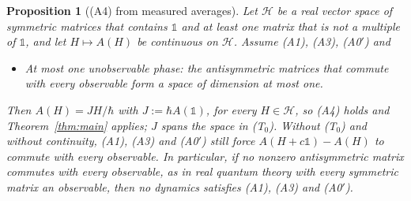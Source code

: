 \documentclass[11pt]{article}
\newtheorem{proposition}[theorem]{Proposition}
\theoremstyle{remark}
\newcommand{\one}{\mathbb{1}}
\begin{document}
\begin{proposition}[(A4) from measured averages]\label{prop:avg}
Let $\mathcal{H}$ be a real vector space of symmetric matrices that contains $\one$ and at least one matrix that is not a multiple of $\one$, and let $H\mapsto A(H)$ be continuous on $\mathcal{H}$. Assume (A1), (A3), (A0$'$) and
\begin{itemize}
\item[(T$_0$)] \emph{At most one unobservable phase:} the antisymmetric matrices that commute with every observable form a space of dimension at most one.
\end{itemize}
Then $A(H)=JH/\hbar$ with $J:=\hbar A(\one)$, for every $H\in\mathcal{H}$, so (A4) holds and Theorem~\ref{thm:main} applies; $J$ spans the space in (T$_0$). Without (T$_0$) and without continuity, (A1), (A3) and (A0$'$) still force $A(H+c\one)-A(H)$ to commute with every observable. In particular, if no nonzero antisymmetric matrix commutes with every observable, as in real quantum theory with every symmetric matrix an observable, then no dynamics satisfies (A1), (A3) and (A0$'$).
\end{proposition}
\end{document}
